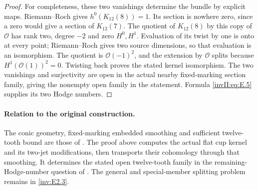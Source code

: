 \begin{proof}
For completeness, these two vanishings determine the bundle by
explicit maps. Riemann--Roch gives $h^0(K_{12}(8))=1$. Its section
is nowhere zero, since a zero would give a section of $K_{12}(7)$.
The quotient of $K_{12}(8)$ by this copy of $\mathcal O$ has rank
two, degree $-2$ and zero $H^0,H^1$. Evaluation of its twist by
one is onto at every point; Riemann--Roch gives two source
dimensions, so that evaluation is an isomorphism. The quotient
is $\mathcal O(-1)^2$, and the extension by $\mathcal O$ splits
because $H^1(\mathcal O(1))^2=0$. Twisting back proves the stated
kernel isomorphism. The two vanishings and surjectivity are open
in the actual nearby fixed-marking section family, giving the
nonempty open family in the statement. Formula
\eqref{invII:eq:E.5} supplies its two Hodge numbers.
\end{proof}

\paragraph{Relation to the original construction.}
The conic geometry, fixed-marking embedded smoothing and sufficient
twelve-tooth bound are those of
\cite[Lemma \texttt{twistor}, Proposition \texttt{comb}, and equation
\texttt{originalnormal}]{Viaclovsky2026Combs}.
The proof above computes the actual flat cup kernel and its two-jet
modifications, then transports their cohomology through that
smoothing. It determines the stated open twelve-tooth family in the
remaining-Hodge-number question of \cite[Section~10(2)]{Viaclovsky2026Combs}.
The general and special-member splitting problem remains in
\ref{inv:E2.3}.
